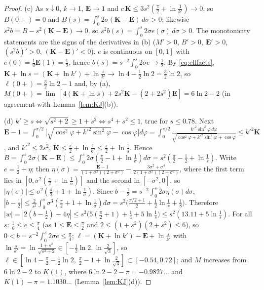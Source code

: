 \documentclass[11pt,a4paper]{article}
\theoremstyle{plain}
\theoremstyle{definition}
\numberwithin{equation}{section}
\begin{document}
\begin{proof}
(c) As $s\downarrow0$, $k\to1$, $\mathbf E\to1$ and $c\,\mathbf K\le3s^2(\frac\pi2+\ln\frac1{k'})\to0$, so $B(0+)=0$ and $B(s)=\int_0^s2\sigma(\mathbf K-\mathbf E)\,d\sigma>0$; likewise $s^2b=B-s^2(\mathbf K-\mathbf E)\to0$, so $s^2b(s)=\int_0^s2\sigma e(\sigma)\,d\sigma>0$. The monotonicity statements are the signs of the derivatives in (b) ($M'>0$, $B'>0$, $\mathbf E'>0$, $(s^2b)'>0$, $(\mathbf K-\mathbf E)'<0$). $e$ is continuous on $[0,1]$ with $e(0)=\frac12\mathbf E(1)=\frac12$, hence $b(s)=s^{-2}\int_0^s2\sigma e\to\frac12$. By \eqref{eq:ellfacts}, $\mathbf K+\ln s=(\mathbf K+\ln k')+\ln\frac s{k'}\to\ln4-\frac12\ln2=\frac32\ln2$, so $\ell(0+)=\frac32\ln2-1$ and, by (a), $M(0+)=\lim\,[4(\mathbf K+\ln s)+2s^2\mathbf K-(2+2s^2)\mathbf E]=6\ln2-2$ (in agreement with Lemma~\ref{lem:KJ}(b)).

(d) $k'\ge s\iff\sqrt{s^2+2}\ge1+s^2\iff s^4+s^2\le1$, true for $s\le0.78$. Next $\mathbf E-1=\int_0^{\pi/2}\big[\sqrt{\cos^2\varphi+k'^2\sin^2\varphi}-\cos\varphi\big]d\varphi=\int_0^{\pi/2}\frac{k'^2\sin^2\varphi\,d\varphi}{\sqrt{\cos^2\varphi+k'^2\sin^2\varphi}+\cos\varphi}\le k'^2\mathbf K$, and $k'^2\le2s^2$, $\mathbf K\le\frac\pi2+\ln\frac1{k'}\le\frac\pi2+\ln\frac1s$. Hence $B=\int_0^s2\sigma(\mathbf K-\mathbf E)\le\int_0^s2\sigma(\frac\pi2-1+\ln\frac1\sigma)d\sigma=s^2(\frac\pi2-\frac12+\ln\frac1s)$. Write $e=\frac12+\eta$; then $\eta(\sigma)=\frac{\mathbf E-1}{(1+\sigma^2)(2+\sigma^2)}-\frac{3\sigma^2+\sigma^4}{2(1+\sigma^2)(2+\sigma^2)}$, where the first term lies in $[0,\sigma^2(\frac\pi2+\ln\frac1\sigma)]$ and the second in $[-\sigma^2,0]$, so $|\eta(\sigma)|\le\sigma^2(\frac\pi2+1+\ln\frac1\sigma)$. Since $b-\frac12=s^{-2}\int_0^s2\sigma\eta(\sigma)d\sigma$, $|b-\frac12|\le\frac2{s^2}\int_0^s\sigma^3(\frac\pi2+1+\ln\frac1\sigma)d\sigma=s^2\big(\frac{\pi/2+1}{2}+\frac12\ln\frac1s+\frac18\big)$. Therefore $|w|=|2(b-\frac12)-4\eta|\le s^2\big(5(\frac\pi2+1)+\frac14+5\ln\frac1s\big)\le s^2(13.11+5\ln\frac1s)$.
For all $s$: $\frac16\le e\le\frac\pi4$ (as $1\le\mathbf E\le\frac\pi2$ and $2\le(1+s^2)(2+s^2)\le6$), so $0<b=s^{-2}\int_0^s2\sigma e\le\frac\pi4$; $\ell=(\mathbf K+\ln k')-\mathbf E+\ln\frac{s}{k'}$ with $\ln\frac s{k'}=\ln\frac{1+s^2}{\sqrt{s^2+2}}\in[-\frac12\ln2,\ln\frac2{\sqrt3}]$, so $\ell\in[\ln4-\frac\pi2-\frac12\ln2,\ \frac\pi2-1+\ln\frac2{\sqrt3}]\subset[-0.54,0.72]$; and $M$ increases from $6\ln2-2$ to $K(1)$, where $6\ln2-2-\pi=-0.9827\ldots$ and $K(1)-\pi=1.1030\ldots$ (Lemma~\ref{lem:KJ}(d)).
\end{proof}
\end{document}
